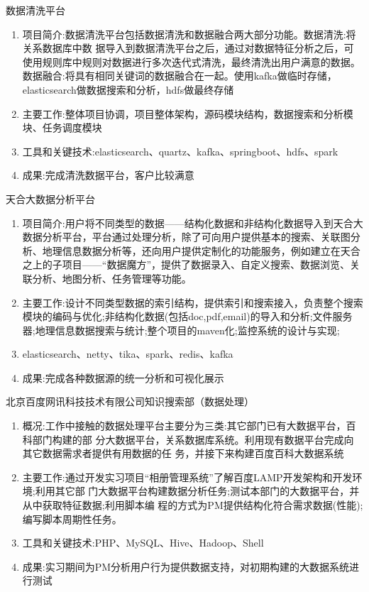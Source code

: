 \documentclass{resume}
\begin{document}
\begin{onehalfspacing}
数据清洗平台
\begin{enumerate}
  \item 项目简介:数据清洗平台包括数据清洗和数据融合两大部分功能。数据清洗:将关系数据库中数 据导入到数据清洗平台之后，通过对数据特征分析之后，可使用规则库中规则对数据进行多次迭代式清洗，最终清洗出用户满意的数据。数据融合:将具有相同关键词的数据融合在一起。使用kafka做临时存储，elasticsearch做数据搜索和分析，hdfs做最终存储
  \item 主要工作:整体项目协调，项目整体架构，源码模块结构，数据搜索和分析模块、任务调度模块
  \item 工具和关键技术:elasticsearch、quartz、kafka、springboot、hdfs、spark
  \item 成果:完成清洗数据平台，客户比较满意
\end{enumerate}
\end{onehalfspacing}
\begin{onehalfspacing}
天合大数据分析平台
\begin{enumerate}
  \item 项目简介:用户将不同类型的数据——结构化数据和非结构化数据导入到天合大数据分析平台，平台通过处理分析，除了可向用户提供基本的搜索、关联图分析、地理信息数据分析等，还向用户提供定制化的功能服务，例如建立在天合之上的子项目——“数据魔方”，提供了数据录入、自定义搜索、数据浏览、关联分析、地图分析、任务管理等功能。
  \item 主要工作:设计不同类型数据的索引结构，提供索引和搜索接入，负责整个搜索模块的编码与优化;非结构化数据(包括doc,pdf,email)的导入和分析;文件服务器;地理信息数据搜索与统计;整个项目的maven化;监控系统的设计与实现;
  \item elasticsearch、netty、tika、spark、redis、kafka
  \item 成果:完成各种数据源的统一分析和可视化展示
\end{enumerate}
\end{onehalfspacing}

\begin{onehalfspacing}
北京百度网讯科技技术有限公司知识搜索部（数据处理）
\begin{enumerate}
  \item 概况:工作中接触的数据处理平台主要分为三类:其它部门已有大数据平台，百科部门构建的部 分大数据平台，关系数据库系统。利用现有数据平台完成向其它数据需求者提供有用数据的任 务，并接下来构建百度百科大数据系统
  \item 主要工作:通过开发实习项目“相册管理系统”了解百度LAMP开发架构和开发环境;利用其它部 门大数据平台构建数据分析任务;测试本部门的大数据平台，并从中获取特征数据;利用脚本编 程的方式为PM提供结构化符合需求数据(性能);编写脚本周期性任务。
  \item 工具和关键技术:PHP、MySQL、Hive、Hadoop、Shell
  \item 成果:实习期间为PM分析用户行为提供数据支持，对初期构建的大数据系统进行测试
\end{enumerate}
\end{onehalfspacing}
\end{document}

